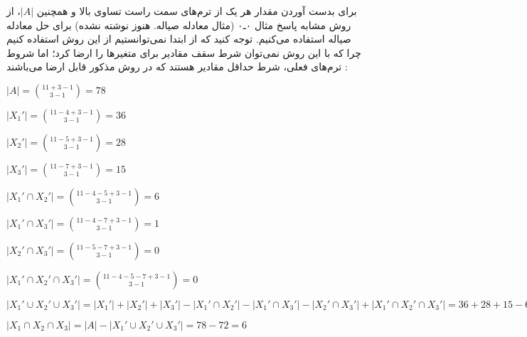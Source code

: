 \begin{problem}
{        برای بدست آوردن مقدار هر یک از ترم‌های سمت راست تساوی بالا و همچنین
        $|A|$،
        از روش مشابه پاسخ مثال ۰ـ۰
        (مثال معادله صیاله. هنوز نوشته نشده)
        برای حل معادله صیاله استفاده می‌کنیم. توجه کنید که از ابتدا نمی‌توانستیم
        از این روش استفاده کنیم چرا که با این روش نمی‌توان شرط سقف مقادیر برای
        متغیر‌ها را ارضا کرد؛ اما شروط ترم‌های فعلی، شرط حداقل مقادیر هستند که
        در روش مذکور قابل ارضا می‌باشند :
        
        \begin{center}
        $ |A| = \binom{11+3-1}{3-1} = 78 $
    
        $ |X_1'| = \binom{11-4+3-1}{3-1} = 36 $
        
        $ |X_2'| = \binom{11-5+3-1}{3-1} = 28 $
    
        $ |X_3'| = \binom{11-7+3-1}{3-1} = 15 $
    
        $ |X_1' \cap X_2'| = \binom{11-4-5+3-1}{3-1} = 6 $
    
        $ |X_1' \cap X_3'| = \binom{11-4-7+3-1}{3-1} = 1 $
    
        $ |X_2' \cap X_3'| = \binom{11-5-7+3-1}{3-1} = 0 $
    
        $ |X_1' \cap X_2' \cap X_3'| = \binom{11-4-5-7+3-1}{3-1} = 0 $
    
        $ |X_1' \cup X_2' \cup X_3'| = |X_1'| + |X_2'| + |X_3'| - |X_1' \cap X_2'| - |X_1' \cap X_3'| - |X_2' \cap X_3'| + |X_1' \cap X_2' \cap X_3'| 
        = 36 + 28 + 15 - 6 - 1 - 0 + 0 = 72 $
    
        $ |X_1 \cap X_2 \cap X_3| = |A| - |X_1' \cup X_2' \cup X_3'| = 78 - 72 = 6 $
        \end{center}
    }
  
\end{problem}